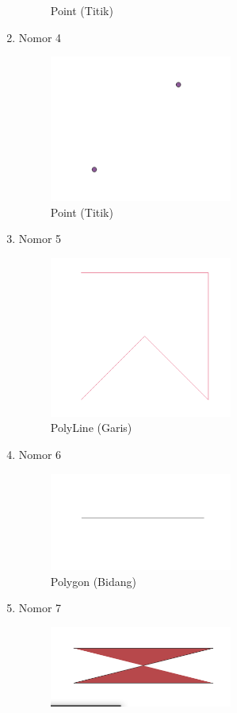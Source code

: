 \begin{enumerate}
\begin{figure}[H]
		\centering
		\caption{Point (Titik)}
	\end{figure}
	\item Nomor 4
	
	\begin{figure}[H]
		\includegraphics[width=6cm]{figures/Tugas2/1174054/no4.png}
		\centering
		\caption{Point (Titik)}
	\end{figure}
	\item Nomor 5
	
	\begin{figure}[H]
		\includegraphics[width=6cm]{figures/Tugas2/1174054/no5.png}
		\centering
		\caption{PolyLine (Garis)}
	\end{figure}
	\item Nomor 6
	
	\begin{figure}[H]
		\includegraphics[width=6cm]{figures/Tugas2/1174054/no6.png}
		\centering
		\caption{Polygon (Bidang)}
	\end{figure}
	\item Nomor 7
	
	\begin{figure}[H]
		\includegraphics[width=6cm]{figures/Tugas2/1174054/no7.png}

\end{figure}
\end{enumerate}
